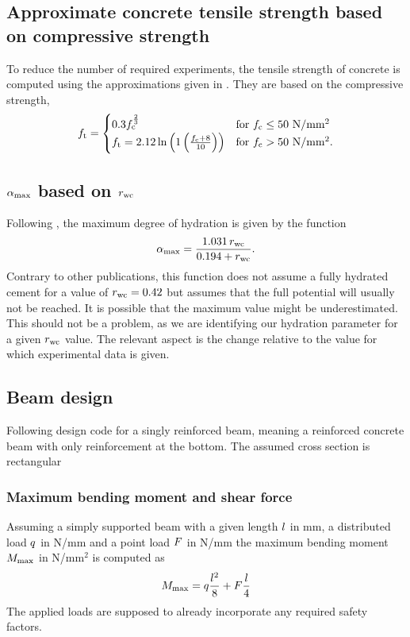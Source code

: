 \subsection{Approximate concrete tensile strength based on compressive strength}
To reduce the number of required experiments, the tensile strength of concrete is computed using the approximations given in \citeauthor{DIN1992-1-1}.
They are based on the compressive strength, 
\begin{align}
f_{\text{t}} = 
\begin{cases}
0.3 f_{\text{c}}^{\frac{2}{3}}  & \text{for $f_{\text{c}} \le 50$ N/mm$^2$}\\
f_{\text{t}} =2.12 \ln \left( 1 \left( \frac{f_{\text{c}} + 8}{10}\right) \right)& \text{for $f_{\text{c}} > 50$ N/mm$^2$}  \label{eq:tensilstrength}.
\end{cases}
\end{align}
\subsection{\texorpdfstring{$\alpha_{\text{max}}$}{Maxiumum DoH} based on \texorpdfstring{$r_{\text{wc}}$}{w/c}}
Following \cite{Mills1966fico}, the maximum degree of hydration is given by the function
\begin{align}
	\alpha_{\text{max}} = \dfrac{1.031\,r_{\text{wc}}}{0.194 + r_{\text{wc}}}.
\end{align}
Contrary to other publications, this function does not assume a fully hydrated cement for a value of $r_{\text{wc}} = 0.42$ but assumes that the full potential will usually not be reached.
It is possible that the maximum value might be underestimated.
This should not be a problem, as we are identifying our hydration parameter for a given $r_{\text{wc}}$ value.
The relevant aspect is the change relative to the value for which experimental data is given.
\subsection{Beam design}
Following design code \citeauthor{DIN1992-1-1} for a singly reinforced beam, meaning a reinforced concrete beam with only reinforcement at the bottom.
The assumed cross section is rectangular

\subsubsection{Maximum bending moment and shear force}
Assuming a simply supported beam with a given length $l$ in mm, a distributed load $q$ in N/mm and a point load $F$ in N/mm
the maximum bending moment $M_{\text{max}}$ in N/mm$^2$ is computed as
\begin{align}
	M_{\text{max}}= q \frac{l^2}{8} + F \frac{l}{4}
\end{align}
The applied loads are supposed to already incorporate any required safety factors.
